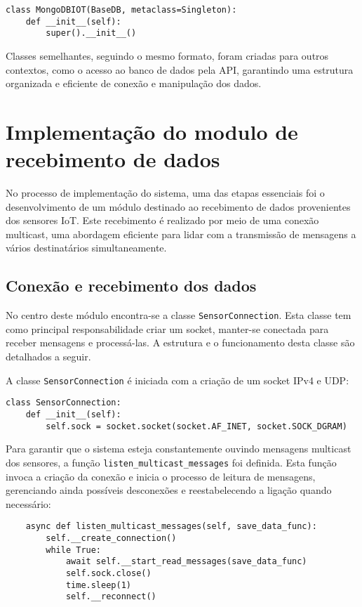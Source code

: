 \begin{verbatim}
class MongoDBIOT(BaseDB, metaclass=Singleton):
    def __init__(self):
        super().__init__()
\end{verbatim}

Classes semelhantes, seguindo o mesmo formato, foram criadas para outros contextos, como o acesso ao banco de dados pela API, garantindo uma estrutura organizada e eficiente de conexão e manipulação dos dados.



\section[Implementação do modulo de recebimento de dados]{Implementação do modulo de recebimento de dados}

No processo de implementação do sistema, uma das etapas essenciais foi o desenvolvimento de um módulo destinado ao recebimento de dados provenientes dos sensores IoT. Este recebimento é realizado por meio de uma conexão multicast, uma abordagem eficiente para lidar com a transmissão de mensagens a vários destinatários simultaneamente.

\subsection[Conexão e recebimento dos dados]{Conexão e recebimento dos dados}

No centro deste módulo encontra-se a classe \texttt{SensorConnection}. Esta classe tem como principal responsabilidade criar um socket, manter-se conectada para receber mensagens e processá-las. A estrutura e o funcionamento desta classe são detalhados a seguir.

A classe \texttt{SensorConnection} é iniciada com a criação de um socket IPv4 e UDP:

\begin{verbatim}
class SensorConnection:
    def __init__(self):
        self.sock = socket.socket(socket.AF_INET, socket.SOCK_DGRAM)
\end{verbatim}

Para garantir que o sistema esteja constantemente ouvindo mensagens multicast dos sensores, a função \texttt{listen\_multicast\_messages} foi definida. Esta função invoca a criação da conexão e inicia o processo de leitura de mensagens, gerenciando ainda possíveis desconexões e reestabelecendo a ligação quando necessário:

\begin{verbatim}
    async def listen_multicast_messages(self, save_data_func):
        self.__create_connection()
        while True:
            await self.__start_read_messages(save_data_func)
            self.sock.close()
            time.sleep(1)
            self.__reconnect()
\end{verbatim}

